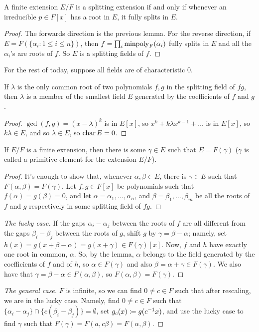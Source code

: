 \begin{theorem}
    A finite extension $E/F$ is a splitting extension if and only if whenever an irreducible $p \in F[x]$ has a root in $E$, it fully splits in $E$.
\end{theorem}
\begin{proof}
    The forwards direction is the previous lemma. For the reverse direction, if $E = F(\{\alpha_i : 1 \leq i \leq n\})$, then $f = \prod_i \operatorname{minpoly}_F(\alpha_i)$ fully splits in $E$ and all the $\alpha_i$'s are roots of $f$. So $E$ is a splitting fields of $f$.
\end{proof}
For the rest of today, suppose all fields are of characteristic $0$.
\begin{lemma}
    If $\lambda$ is the only common root of two polynomials $f, g$ in the splitting field of $fg$, then $\lambda$ is a member of the smallest field $E$ generated by the coefficients of $f$ and $g$.
\end{lemma}
\begin{proof}
    $\gcd(f, g) = (x - \lambda)^k$ is in $E[x]$, so $x^k + k \lambda x^{k-1} + \dots$ is in $E[x]$, so $k\lambda \in E$, and so $\lambda \in E$, so $\operatorname{char} E = 0$.
\end{proof}
\begin{theorem}
    If $E/F$ is a finite extension, then there is some $\gamma \in E$ such that $E = F(\gamma)$ ($\gamma$ is called a primitive element for the extension $E/F$).
\end{theorem}
\begin{proof}
    It's enough to show that, whenever $\alpha, \beta \in E$, there is $\gamma \in E$ such that $F(\alpha, \beta) = F(\gamma)$. Let $f, g \in F[x]$ be polynomials such that $f(\alpha) = g(\beta) = 0$, and let $\alpha = \alpha_1, \dots, \alpha_n$, and $\beta = \beta_1, \dots, \beta_m$ be all the roots of $f$ and $g$ respectively in some splitting field of $fg$.
\end{proof}
\begin{proof}[The lucky case]
    If the gaps $\alpha_i - \alpha_j$ between the roots of $f$ are all different from the gaps $\beta_i - \beta_j$ between the roots of $g$, shift $g$ by $\gamma = \beta - \alpha$; namely, set $h(x) = g(x + \beta - \alpha) = g(x + \gamma) \in F(\gamma)[x]$. Now, $f$ and $h$ have exactly one root in common, $\alpha$. So, by the lemma, $\alpha$ belongs to the field generated by the coefficients of $f$ and of $h$, so $\alpha \in F(\gamma)$ and also $\beta = \alpha + \gamma \in F(\gamma)$. We also have that $\gamma = \beta - \alpha \in F(\alpha, \beta)$, so $F(\alpha, \beta) = F(\gamma)$.
\end{proof}
\begin{proof}[The general case]
    $F$ is infinite, so we can find $0 \neq c \in F$ such that after rescaling, we are in the lucky case. Namely, find $0 \neq c \in F$ such that $\{\alpha_i - \alpha_j\} \cap \{c(\beta_i - \beta_j)\} = \emptyset$, set $g_c(x) \coloneq g(c^{-1} x)$, and use the lucky case to find $\gamma$ such that $F(\gamma) = F(a, c \beta) = F(\alpha, \beta)$.
\end{proof}